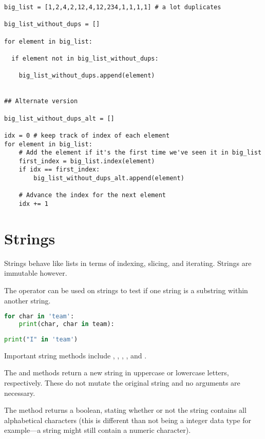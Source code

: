 \begin{lstlisting}
big_list = [1,2,4,2,12,4,12,234,1,1,1,1] # a lot duplicates

big_list_without_dups = []

for element in big_list:

  if element not in big_list_without_dups:
 
    big_list_without_dups.append(element) 
    
    
## Alternate version

big_list_without_dups_alt = []

idx = 0 # keep track of index of each element
for element in big_list:
    # Add the element if it's the first time we've seen it in big_list
    first_index = big_list.index(element)
    if idx == first_index:
        big_list_without_dups_alt.append(element)
        
    # Advance the index for the next element
    idx += 1
\end{lstlisting}


\section{Strings}

Strings behave like lists in terms of indexing, slicing, and iterating. Strings are immutable however.

The  operator can be used on strings to test if one string is a substring within another string. 

\begin{lstlisting}[language = Python]
for char in 'team':
    print(char, char in team):
    
print("I" in 'team')
\end{lstlisting}


Important string methods include , , , , and . 

The  and  methods return a new string in uppercase or lowercase letters, respectively. These do not mutate the original string and no arguments are necessary. 

The  method returns a boolean, stating whether or not the string contains all alphabetical characters (this is different than not being a integer data type for example---a string might still contain a numeric character). 

